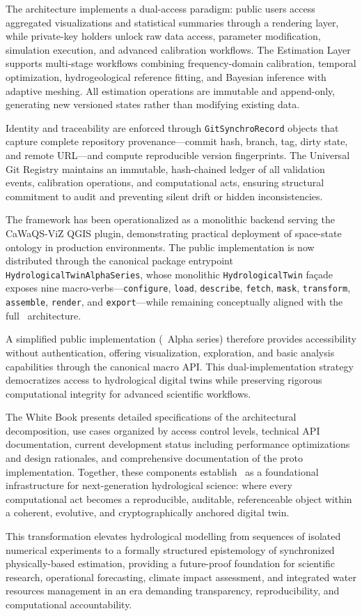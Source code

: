 The architecture implements a dual-access paradigm: public users access aggregated visualizations and statistical summaries through a rendering layer, while private-key holders unlock raw data access, parameter modification, simulation execution, and advanced calibration workflows. The Estimation Layer supports multi-stage workflows combining frequency-domain calibration, temporal optimization, hydrogeological reference fitting, and Bayesian inference with adaptive meshing. All estimation operations are immutable and append-only, generating new versioned states rather than modifying existing data.

Identity and traceability are enforced through \texttt{GitSynchroRecord} objects that capture complete repository provenance---commit hash, branch, tag, dirty state, and remote URL---and compute reproducible version fingerprints. The Universal Git Registry maintains an immutable, hash-chained ledger of all validation events, calibration operations, and computational acts, ensuring structural commitment to audit and preventing silent drift or hidden inconsistencies.

The framework has been operationalized as a monolithic backend serving the CaWaQS-ViZ QGIS plugin, demonstrating practical deployment of space-state ontology in production environments. The public implementation is now distributed through the canonical package entrypoint \texttt{HydrologicalTwinAlphaSeries}, whose monolithic \texttt{HydrologicalTwin} façade exposes nine macro-verbs---\texttt{configure}, \texttt{load}, \texttt{describe}, \texttt{fetch}, \texttt{mask}, \texttt{transform}, \texttt{assemble}, \texttt{render}, and \texttt{export}---while remaining conceptually aligned with the full \hydrot\ architecture.

A simplified public implementation (\hydrot\ Alpha series) therefore provides accessibility without authentication, offering visualization, exploration, and basic analysis capabilities through the canonical macro API. This dual-implementation strategy democratizes access to hydrological digital twins while preserving rigorous computational integrity for advanced scientific workflows.

The White Book presents detailed specifications of the architectural decomposition, use cases organized by access control levels, technical API documentation, current development status including performance optimizations and design rationales, and comprehensive documentation of the proto implementation. Together, these components establish \hydrot\ as a foundational infrastructure for next-generation hydrological science: where every computational act becomes a reproducible, auditable, referenceable object within a coherent, evolutive, and cryptographically anchored digital twin.

This transformation elevates hydrological modelling from sequences of isolated numerical experiments to a formally structured epistemology of synchronized physically-based estimation, providing a future-proof foundation for scientific research, operational forecasting, climate impact assessment, and integrated water resources management in an era demanding transparency, reproducibility, and computational accountability.

\newpage
